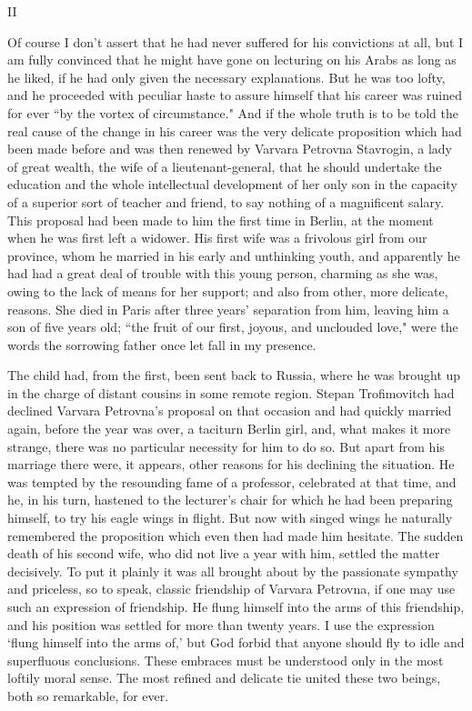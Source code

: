 \documentclass[12pt]{article}
\begin{document}
\vspace{12pt}
II


\vspace{12pt}
Of course I don't assert that he had never suffered for his convictions
at all, but I am fully convinced that he might have gone on lecturing
on his Arabs as long as he liked, if he had only given the necessary
explanations. But he was too lofty, and he proceeded with peculiar haste
to assure himself that his career was ruined for ever ``by the vortex of
circumstance." And if the whole truth is to be told the real cause of
the change in his career was the very delicate proposition which had
been made before and was then renewed by Varvara Petrovna Stavrogin, a
lady of great wealth, the wife of a lieutenant-general, that he should
undertake the education and the whole intellectual development of her
only son in the capacity of a superior sort of teacher and friend, to
say nothing of a magnificent salary. This proposal had been made to
him the first time in Berlin, at the moment when he was first left a
widower. His first wife was a frivolous girl from our province, whom he
married in his early and unthinking youth, and apparently he had had a
great deal of trouble with this young person, charming as she was,
owing to the lack of means for her support; and also from other, more
delicate, reasons. She died in Paris after three years' separation
from him, leaving him a son of five years old; ``the fruit of our first,
joyous, and unclouded love," were the words the sorrowing father once
let fall in my presence.


\vspace{12pt}
The child had, from the first, been sent back to Russia, where he was
brought up in the charge of distant cousins in some remote region.
Stepan Trofimovitch had declined Varvara Petrovna's proposal on that
occasion and had quickly married again, before the year was over, a
taciturn Berlin girl, and, what makes it more strange, there was no
particular necessity for him to do so. But apart from his marriage there
were, it appears, other reasons for his declining the situation. He was
tempted by the resounding fame of a professor, celebrated at that time,
and he, in his turn, hastened to the lecturer's chair for which he had
been preparing himself, to try his eagle wings in flight. But now with
singed wings he naturally remembered the proposition which even then had
made him hesitate. The sudden death of his second wife, who did not live
a year with him, settled the matter decisively. To put it plainly it was
all brought about by the passionate sympathy and priceless, so to
speak, classic friendship of Varvara Petrovna, if one may use such
an expression of friendship. He flung himself into the arms of this
friendship, and his position was settled for more than twenty years. I
use the expression `flung himself into the arms of,' but God forbid that
anyone should fly to idle and superfluous conclusions. These embraces
must be understood only in the most loftily moral sense. The most
refined and delicate tie united these two beings, both so remarkable,
for ever.
\end{document}
